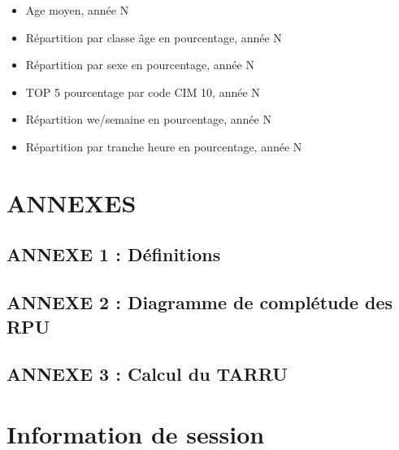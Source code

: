 \documentclass[]{article}
\begin{document}
\begin{itemize}
\itemsep1pt\parskip0pt
\item
  Age moyen, année N
\item
  Répartition par classe âge en pourcentage, année N
\item
  Répartition par sexe en pourcentage, année N
\item
  TOP 5 pourcentage par code CIM 10, année N
\item
  Répartition we/semaine en pourcentage, année N
\item
  Répartition par tranche heure en pourcentage, année N
\end{itemize}

\section{ANNEXES}\label{annexes}

\subsection{ANNEXE 1 : Définitions}\label{annexe-1-definitions}

\subsection{ANNEXE 2 : Diagramme de complétude des
RPU}\label{annexe-2-diagramme-de-completude-des-rpu}

\subsection{ANNEXE 3 : Calcul du TARRU}\label{annexe-3-calcul-du-tarru}

\section{Information de session}\label{information-de-session}
\end{document}
